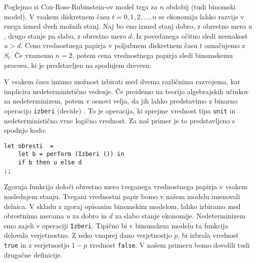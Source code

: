 \documentclass[a4paper,12pt]{article}
\theoremstyle{definition} %
\begin{document}
Poglejmo si Cox-Ross-Rubinstein-ov model trga za $n$ obdobij (tudi binomski model). V vsakem diskretnem času $t = 0, 1, 2,…,n$  se ekonomija lahko razvije v enega izmed dveh možnih stanj. Naj bo eno izmed stanj dobro, z obrestno mero $u$, drugo stanje pa slabo, z obrestno mero $d$. Iz povedanega očitno sledi neenakost $u > d$. Ceno vrednostnega papirja v poljubnem diskretnem času $t$ označujemo z $S_t$. Če vzamemo $n = 2$, potem cena vrednostnega papirja sledi binomskemu procesu, ki je predstavljen na spodnjem drevesu:
\begin{center}
\end{center}
V vsakem času imamo možnost izbirati med dvema različnima razvojema, kar implicira nedeterministično vedenje. Če preidemo na teorijo algebrajskih učinkov za nedeterminizem, potem v osnovi velja, da jih lahko predstavimo z binarno operacijo \lstinline{izberi} (decide) \cite{introduction}. To je operacija, ki sprejme vrednost tipa \lstinline{unit} in nedeterministično vrne logično vrednost. Za naš primer je to predstavljeno s spodnjo kodo:
\begin{lstlisting}
let obresti  =
	let b = perform (Izberi ()) in
	if b then u else d
;;
\end{lstlisting}
Zgornja funkcija določi obrestno mero tveganega vrednostnega papirja v vsakem naslednjem stanju. Tvegani vrednostni papir bomo v našem modelu imenovali delnica. V skladu z zgoraj opisanim binomskim modelom, lahko izbiramo med obrestnima merama $u$ za dobro in $d$ za slabo stanje ekonomije. Nedeterminizem smo zajeli v operaciji \lstinline{Izberi}. Tipično bi v binomskem modelu ta funkcija delovala verjetnostno. Z neko vnaprej dano verjetnostjo $p$, bi izbrala vrednost \lstinline{true} in z verjetnostjo $1 - p$ vrednost \lstinline{false}. V našem primeru bomo dovolili tudi drugačne definicije.
\end{document}
